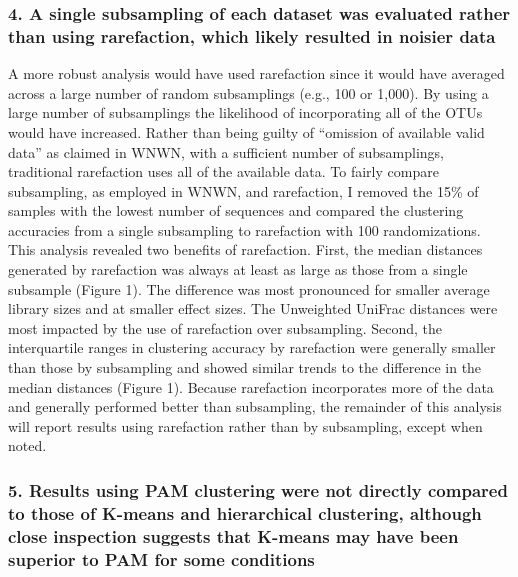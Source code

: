 \documentclass[
]{article}
\begin{document}
\hypertarget{a-single-subsampling-of-each-dataset-was-evaluated-rather-than-using-rarefaction-which-likely-resulted-in-noisier-data}{%
\subsubsection{4. A single subsampling of each dataset was evaluated
rather than using rarefaction, which likely resulted in noisier
data}\label{a-single-subsampling-of-each-dataset-was-evaluated-rather-than-using-rarefaction-which-likely-resulted-in-noisier-data}}

A more robust analysis would have used rarefaction since it would have
averaged across a large number of random subsamplings (e.g., 100 or
1,000). By using a large number of subsamplings the likelihood of
incorporating all of the OTUs would have increased. Rather than being
guilty of ``omission of available valid data'' as claimed in WNWN, with
a sufficient number of subsamplings, traditional rarefaction uses all of
the available data. To fairly compare subsampling, as employed in WNWN,
and rarefaction, I removed the 15\% of samples with the lowest number of
sequences and compared the clustering accuracies from a single
subsampling to rarefaction with 100 randomizations. This analysis
revealed two benefits of rarefaction. First, the median distances
generated by rarefaction was always at least as large as those from a
single subsample (Figure 1). The difference was most pronounced for
smaller average library sizes and at smaller effect sizes. The
Unweighted UniFrac distances were most impacted by the use of
rarefaction over subsampling. Second, the interquartile ranges in
clustering accuracy by rarefaction were generally smaller than those by
subsampling and showed similar trends to the difference in the median
distances (Figure 1). Because rarefaction incorporates more of the data
and generally performed better than subsampling, the remainder of this
analysis will report results using rarefaction rather than by
subsampling, except when noted.

\hypertarget{results-using-pam-clustering-were-not-directly-compared-to-those-of-k-means-and-hierarchical-clustering-although-close-inspection-suggests-that-k-means-may-have-been-superior-to-pam-for-some-conditions}{%
\subsubsection{5. Results using PAM clustering were not directly
compared to those of K-means and hierarchical clustering, although close
inspection suggests that K-means may have been superior to PAM for some
conditions}\label{results-using-pam-clustering-were-not-directly-compared-to-those-of-k-means-and-hierarchical-clustering-although-close-inspection-suggests-that-k-means-may-have-been-superior-to-pam-for-some-conditions}}
\end{document}
